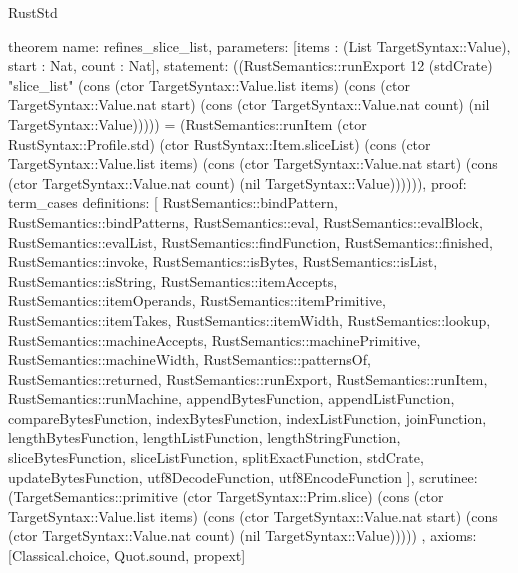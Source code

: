 \begin{lexlean}{RustStd}
\begin{semanticmodule}
theorem{
  name: refines_slice_list,
  parameters: [items : (List TargetSyntax::Value), start : Nat, count : Nat],
  statement: ((RustSemantics::runExport 12 (stdCrate) "slice_list" (cons (ctor TargetSyntax::Value.list items) (cons (ctor TargetSyntax::Value.nat start) (cons (ctor TargetSyntax::Value.nat count) (nil TargetSyntax::Value))))) = (RustSemantics::runItem (ctor RustSyntax::Profile.std) (ctor RustSyntax::Item.sliceList) (cons (ctor TargetSyntax::Value.list items) (cons (ctor TargetSyntax::Value.nat start) (cons (ctor TargetSyntax::Value.nat count) (nil TargetSyntax::Value)))))),
  proof: term_cases{
    definitions: [
      RustSemantics::bindPattern,
      RustSemantics::bindPatterns,
      RustSemantics::eval,
      RustSemantics::evalBlock,
      RustSemantics::evalList,
      RustSemantics::findFunction,
      RustSemantics::finished,
      RustSemantics::invoke,
      RustSemantics::isBytes,
      RustSemantics::isList,
      RustSemantics::isString,
      RustSemantics::itemAccepts,
      RustSemantics::itemOperands,
      RustSemantics::itemPrimitive,
      RustSemantics::itemTakes,
      RustSemantics::itemWidth,
      RustSemantics::lookup,
      RustSemantics::machineAccepts,
      RustSemantics::machinePrimitive,
      RustSemantics::machineWidth,
      RustSemantics::patternsOf,
      RustSemantics::returned,
      RustSemantics::runExport,
      RustSemantics::runItem,
      RustSemantics::runMachine,
      appendBytesFunction,
      appendListFunction,
      compareBytesFunction,
      indexBytesFunction,
      indexListFunction,
      joinFunction,
      lengthBytesFunction,
      lengthListFunction,
      lengthStringFunction,
      sliceBytesFunction,
      sliceListFunction,
      splitExactFunction,
      stdCrate,
      updateBytesFunction,
      utf8DecodeFunction,
      utf8EncodeFunction
    ],
    scrutinee: (TargetSemantics::primitive (ctor TargetSyntax::Prim.slice) (cons (ctor TargetSyntax::Value.list items) (cons (ctor TargetSyntax::Value.nat start) (cons (ctor TargetSyntax::Value.nat count) (nil TargetSyntax::Value)))))
  },
  axioms: [Classical.choice, Quot.sound, propext]
}


\end{semanticmodule}
\end{lexlean}
